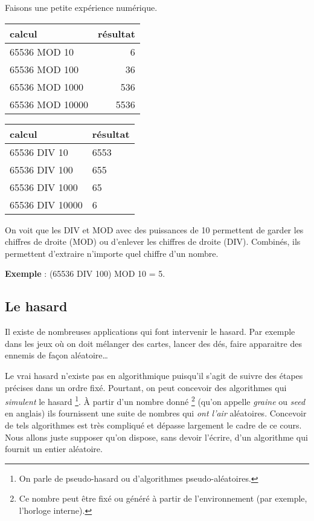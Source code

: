 			Faisons une petite expérience numérique.
			\begin{center}
			\begin{tabular}{|l|r|}\hline
				calcul & résultat \\\hline
				\hline
				65536 MOD 10 & 6 \\  
				65536 MOD 100 & 36 \\  
				65536 MOD 1000 & 536 \\  
				65536 MOD 10000 & 5536 \\ 
				\hline 
			\end{tabular}
			\qquad
			\begin{tabular}{|l|l|}\hline
				calcul & résultat \\\hline
				\hline
				65536 DIV 10 & 6553 \\  
				65536 DIV 100 & 655 \\  
				65536 DIV 1000 & 65 \\  
				65536 DIV 10000 & 6 \\ 
				\hline 
			\end{tabular}
			\end{center}
		
			On voit que les DIV et MOD avec des puissances de 10
			permettent de garder les chiffres de droite (MOD)
			ou d'enlever les chiffres de droite (DIV).
			Combinés, ils permettent d'extraire n'importe quel
			chiffre d'un nombre.
			
			\textbf{Exemple} : (65536 DIV 100) MOD 10 = 5.

		\subsection{Le hasard}
			
			Il existe de nombreuses applications 
			qui font intervenir le hasard.
			Par exemple dans les jeux où on doit mélanger des cartes,
			lancer des dés, 
			faire apparaitre des ennemis de façon aléatoire\dots
			
			Le vrai hasard n'existe pas en algorithmique
			puisqu'il s'agit de suivre des étapes précises
			dans un ordre fixé.
			Pourtant, on peut concevoir des algorithmes
			qui \emph{simulent} le hasard%
			\footnote{%
				On parle de pseudo-hasard
				ou d'algorithmes pseudo-aléatoires.
			}.
			À partir d'un nombre donné%
			\footnote{%
				Ce nombre peut être fixé ou généré à partir
				de l'environnement 
				(par exemple, l'horloge interne).
			}
			(qu'on appelle \emph{graine} ou \emph{seed} en anglais)
			ils fournissent une suite de nombres qui \emph{ont l'air}
			aléatoires.			
			Concevoir de tels algorithmes est très compliqué
			et dépasse largement le cadre de ce cours.
			Nous allons juste supposer qu'on dispose,
			sans devoir l'écrire,
			d'un algorithme qui fournit un entier aléatoire.
			

